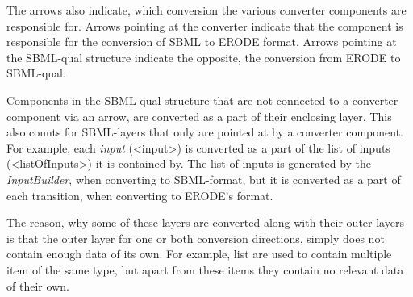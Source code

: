 The arrows also indicate, which conversion the various converter components are responsible for. Arrows pointing at the converter indicate that the component is responsible for the conversion of SBML to ERODE format. Arrows pointing at the SBML-qual structure indicate the opposite, the conversion from ERODE to SBML-qual.

Components in the SBML-qual structure that are not connected to a converter component via an arrow, are converted as a part of their enclosing layer. This also counts for SBML-layers that only are pointed at by a converter component. For example, each \emph{input} (<input>) is converted as a part of the list of inputs (<listOfInputs>) it is contained by. The list of inputs is generated by the \emph{InputBuilder}, when converting to SBML-format, but it is converted as a part of each transition, when converting to ERODE's format.

The reason, why some of these layers are converted along with their outer layers is that the outer layer for one or both conversion directions, simply does not contain enough data of its own. For example, list are used to contain multiple item of the same type, but apart from these items they contain no relevant data of their own.


